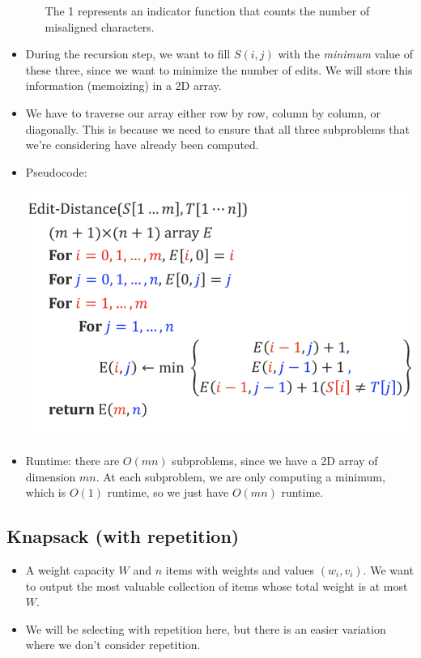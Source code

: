 \begin{itemize}
\begin{itemize}
				The 1 represents an indicator function that counts the number of misaligned characters.
			\end{itemize}
		\item During the recursion step, we want to fill $S(i, j)$ with the \textit{minimum} value 
			of these three, since we want to minimize the number of edits. We will store this information 
			(memoizing) in a 2D array.
		\item We have to traverse our array either row by row, column by column, or diagonally. This is because
			we need to ensure that all three subproblems that we're considering have already been 
			computed. 
		\item Pseudocode:
			\begin{center}
				\includegraphics[scale=0.5]{alignment-pseudocode.png}
			\end{center}
		\item Runtime: there are $O(mn)$ subproblems, since we have a 2D array of dimension $mn$. At each 
			subproblem, we are only computing a minimum, which is $O(1)$ runtime, so we just have 
			$O(mn)$ runtime. 
			

	\end{itemize}
	\subsection{Knapsack (with repetition)}
	\begin{itemize}
		\item A weight capacity $W$ and $n$ items with weights and values $(w_i, v_i)$. We want to output
			the most valuable collection of items whose total weight is at most $W$.
		\item We will be selecting with repetition here, but there is an easier variation where we don't
			consider repetition.
	\end{itemize}
